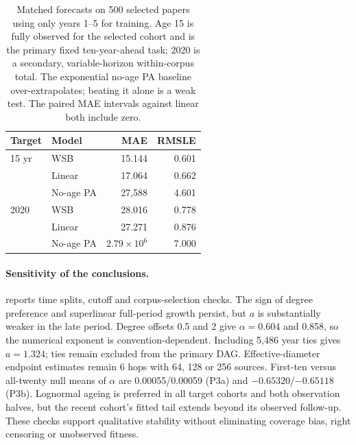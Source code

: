 \begin{table}[t]
\centering\small
\setlength{\tabcolsep}{4pt}
\begin{tabular*}{\columnwidth}{@{\extracolsep{\fill}}llrr@{}}
\toprule
Target & Model & MAE & RMSLE\\
\midrule
15 yr & WSB & 15.144 & 0.601\\
 & Linear & 17.064 & 0.662\\
 & No-age PA & 27,588 & 4.601\\
\midrule
2020 & WSB & 28.016 & 0.778\\
 & Linear & 27.271 & 0.876\\
 & No-age PA & $2.79\!\times\!10^6$ & 7.000\\
\bottomrule
\end{tabular*}
\caption{Matched forecasts on 500 selected papers using only years 1--5 for
training. Age 15 is fully observed for the selected cohort and is the primary fixed
ten-year-ahead task; 2020 is a secondary, variable-horizon within-corpus total.
The exponential no-age PA baseline over-extrapolates; beating it alone is a weak
test. The paired MAE intervals against linear both include zero.}
\label{tab:b-forecast}
\end{table}

\paragraph{Sensitivity of the conclusions.}
 reports time splits, cutoff and corpus-selection checks.
The sign of degree preference and superlinear full-period growth persist, but
$a$ is substantially weaker in the late period. Degree offsets 0.5 and 2 give
$\alpha=0.604$ and 0.858, so the numerical exponent is convention-dependent.
Including 5,486 year ties gives $a=1.324$; ties remain excluded from the primary
DAG. Effective-diameter endpoint estimates remain 6 hops with 64, 128 or 256
sources. First-ten versus all-twenty null means of $\alpha$ are 0.00055/0.00059
(P3a) and $-0.65320$/$-0.65118$ (P3b).
Lognormal ageing is preferred in all target cohorts and both observation halves,
but the recent cohort's fitted tail extends beyond its observed follow-up.
These checks support qualitative stability without eliminating coverage bias,
right censoring or unobserved fitness.

